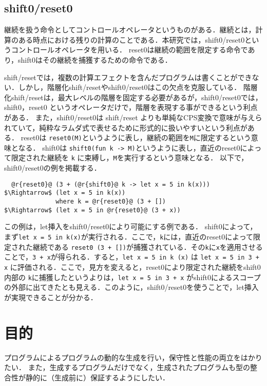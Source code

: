 \documentclass[10pt,a4j,xcolor=dvipsnames,twocolumn]{jarticle}
\theoremstyle{definition}
\begin{document}
\subsection{shift0/reset0}
継続を扱う命令としてコントロールオペレータというものがある．継続とは，計算のある時点における残りの計算のことである．本研究では，shift0/reset0というコントロールオペレータを用いる．
reset0は継続の範囲を限定する命令であり，shift0はその継続を捕獲するための命令である．

shift/reset\cite{Danvy1990}では，複数の計算エフェクトを含んだプログラムは書くことができない．しかし，階層化shift/resetやshift0/reset0はこの欠点を克服している．
階層化shift/reset\cite{Danvy1990}は，最大レベルの階層を固定する必要があるが，shift0/reset0では，shift0，reset0 というオペレータだけで，階層を表現する事ができるという利点がある．
また，shift0/reset0は shift/reset よりも単純なCPS変換で意味が与えられていて，純粋なラムダ式で表せるために形式的に扱いやすいという利点がある．
reset0は \lstinline|reset0(M)|というように表し，継続の範囲を\lstinline|M|に限定するという意味となる．
shift0は \lstinline|shift0(fun k -> M)|というように表し，直近のreset0によって限定された継続を \lstinline|k| に束縛し，\lstinline|M|を実行するという意味となる．
以下で，shift0/reset0の例を掲載する．

\begin{lstlisting}
  @r{reset0}@ (3 + (@r{shift0}@ k -> let x = 5 in k(x)))
$\Rightarrow$ (let x = 5 in k(x))
              where k = @r{reset0}@ (3 + [])
$\Rightarrow$ (let x = 5 in @r{reset0}@ (3 + x))
\end{lstlisting}
この例は，let挿入をshift0/reset0により可能にする例である．
shift0によって，まず\lstinline|let x = 5 in k(x)|が実行される．ここで，\lstinline|k|には，直近のreset0によって限定された継続である \lstinline|reset0 (3 + [])|が捕獲されている．その\lstinline|k|に\lstinline|x|を適用させることで，\lstinline|3 + x|が得られる．すると，\lstinline|let x = 5 in k (x)| は \lstinline|let x = 5 in 3 + x| に評価される．ここで，見方を変えると，reset0により限定された継続をshift0内部の \lstinline|k|に捕獲したというよりは，\lstinline|let x = 5 in 3 + x| がshift0によるスコープの外部に出てきたとも見える．このように，shift0/reset0を使うことで，let挿入が実現できることが分かる．

\section{目的}
プログラムによるプログラムの動的な生成を行い，保守性と性能の両立をはかりたい．
また，生成するプログラムだけでなく，生成されたプログラムも型の整合性が静的に（生成前に）保証するようにしたい．
\end{document}
